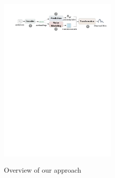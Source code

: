 



\begin{figure}[t!]
\begin{center}
\includegraphics[width=0.52\textwidth]{figures/overview.pdf}
\vspace{-5mm}	
\caption{Overview of our approach}
\vspace{-2mm}
\label{fig: denoise_framework}
\end{center}
\end{figure}


